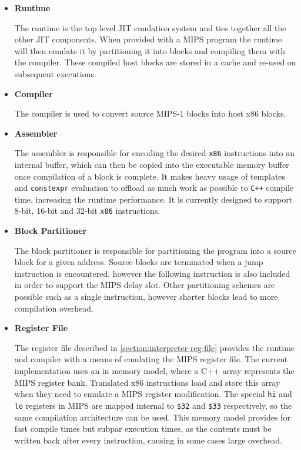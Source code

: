 \begin{itemize}
    \item \textbf{Runtime}

    The runtime is the top level JIT emulation system and ties together all the other JIT components. When provided with a MIPS program the runtime will then emulate it by partitioning it into blocks and compiling them with the compiler. These compiled host blocks are stored in a cache and re-used on subsequent executions.

    \item \textbf{Compiler}

    The compiler is used to convert source MIPS-1 blocks into host x86 blocks.

    \item \textbf{Assembler}

    The assembler is responsible for encoding the desired \texttt{x86} instructions into an internal buffer, which can then be copied into the executable memory buffer once compilation of a block is complete. It makes heavy usage of templates and \texttt{constexpr} evaluation to offload as much work as possible to \texttt{C++} compile time, increasing the runtime performance. It is currently designed to support 8-bit, 16-bit and 32-bit \texttt{x86} instructions.

    \item \textbf{Block Partitioner}

    The block partitioner is responsible for partitioning the program into a source block for a given address. Source blocks are terminated when a jump instruction is encountered, however the following instruction is also included in order to support the MIPS delay slot. Other partitioning schemes are possible such as a single instruction, however shorter blocks lead to more compilation overhead.

    \item \textbf{Register File}

    The register file described in \autoref{section:interpreter-reg-file} provides the runtime and compiler with a means of emulating the MIPS register file. The current implementation uses an in memory model, where a C++ array represents the MIPS register bank. Translated x86 instructions load and store this array when they need to emulate a MIPS register modification. The special \texttt{hi} and \texttt{lo} registers in MIPS are mapped internal to \texttt{\$32} and \texttt{\$33} respectively, so the same compilation architecture can be used. This memory model provides for fast compile times but subpar execution times, as the contents must be written back after every instruction, causing in some cases large overhead.


\end{itemize}
